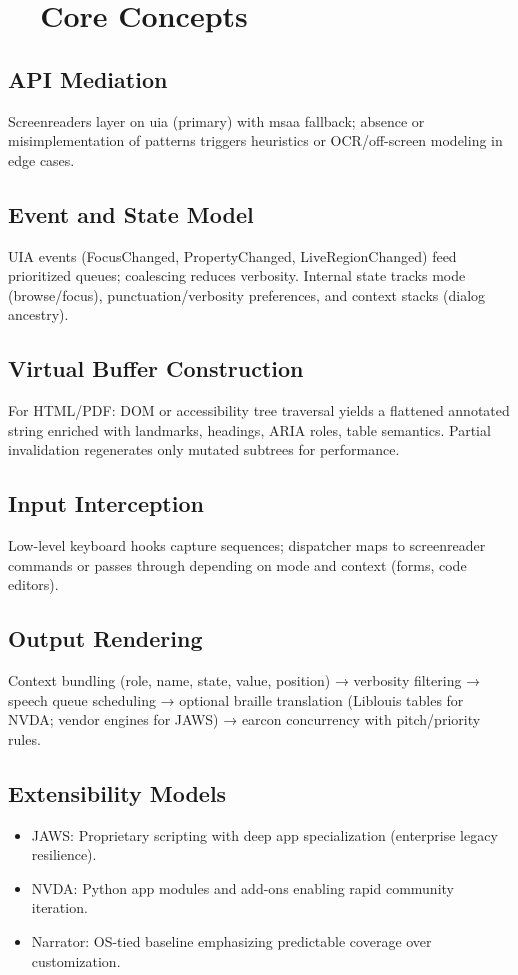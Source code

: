 \section{~~Core Concepts}
\label{sec:sr25-core-concepts}
\subsection*{API Mediation}
Screenreaders layer on \gls{uia} (primary) with \gls{msaa} fallback; absence or misimplementation of patterns triggers heuristics or OCR/off-screen modeling in edge cases.

\subsection*{Event and State Model}
UIA events (FocusChanged, PropertyChanged, LiveRegionChanged) feed prioritized queues; coalescing reduces verbosity. Internal state tracks mode (browse/focus), punctuation/verbosity preferences, and context stacks (dialog ancestry).

\subsection*{Virtual Buffer Construction}
For HTML/PDF: DOM or accessibility tree traversal yields a flattened annotated string enriched with landmarks, headings, ARIA roles, table semantics. Partial invalidation regenerates only mutated subtrees for performance.

\subsection*{Input Interception}
Low-level keyboard hooks capture sequences; dispatcher maps to screenreader commands or passes through depending on mode and context (forms, code editors).

\subsection*{Output Rendering}
Context bundling (role, name, state, value, position) → verbosity filtering → speech queue scheduling → optional braille translation (Liblouis tables for NVDA; vendor engines for JAWS) → earcon concurrency with pitch/priority rules.

\subsection*{Extensibility Models}
\begin{itemize}
	\item JAWS: Proprietary scripting with deep app specialization (enterprise legacy resilience).
	\item NVDA: Python app modules and add-ons enabling rapid community iteration.
	\item Narrator: OS-tied baseline emphasizing predictable coverage over customization.
\end{itemize}

